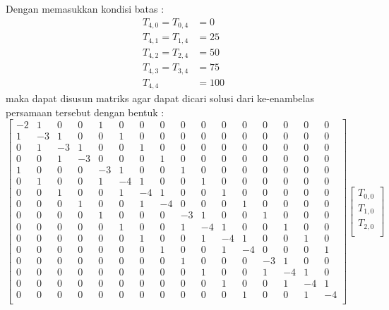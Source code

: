 \documentclass[a4paper,12pt]{article}
\numberwithin{equation}{section} %
\begin{document}
Dengan memasukkan kondisi batas :
\begin{align*}
T_{4,0} = T_{0,4} &= 0\\ 
T_{4,1} = T_{1,4} &= 25\\ 
T_{4,2} = T_{2,4} &= 50\\ 
T_{4,3} = T_{3,4} &= 75\\ 
T_{4,4} &= 100
\end{align*}
maka dapat disusun matriks agar dapat dicari solusi dari ke-enambelas persamaan tersebut dengan bentuk :
\setcounter{MaxMatrixCols}{20}
\begin{equation}
\begin{bmatrix}
-2 & 1 & 0 & 0 & 1 & 0 & 0 & 0 & 0 & 0 & 0 & 0 & 0 & 0 & 0 & 0\\ 
1 & -3 & 1 & 0 & 0 & 1 & 0 & 0 & 0 & 0 & 0 & 0 & 0 & 0 & 0 & 0\\ 
0 & 1 & -3 & 1 & 0 & 0 & 1 & 0 & 0 & 0 & 0 & 0 & 0 & 0 & 0 & 0\\ 
0 & 0 & 1 & -3 & 0 & 0 & 0 & 1 & 0 & 0 & 0 & 0 & 0 & 0 & 0 & 0\\ 
1 & 0 & 0 & 0 & -3 & 1 & 0 & 0 & 1 & 0 & 0 & 0 & 0 & 0 & 0 & 0\\ 
0 & 1 & 0 & 0 & 1 & -4 & 1 & 0 & 0 & 1 & 0 & 0 & 0 & 0 & 0 & 0\\ 
0 & 0 & 1 & 0 & 0 & 1 & -4 & 1 & 0 & 0 & 1 & 0 & 0 & 0 & 0 & 0\\
0 & 0 & 0 & 1 & 0 & 0 & 1 & -4 & 0 & 0 & 0 & 1 & 0 & 0 & 0 & 0\\
0 & 0 & 0 & 0 & 1 & 0 & 0 & 0 & -3 & 1 & 0 & 0 & 1 & 0 & 0 & 0\\
0 & 0 & 0 & 0 & 0 & 1 & 0 & 0 & 1 & -4 & 1 & 0 & 0 & 1 & 0 & 0\\
0 & 0 & 0 & 0 & 0 & 0 & 1 & 0 & 0 & 1 & -4 & 1 & 0 & 0 & 1 & 0\\
0 & 0 & 0 & 0 & 0 & 0 & 0 & 1 & 0 & 0 & 1 & -4 & 0 & 0 & 0 & 1\\
0 & 0 & 0 & 0 & 0 & 0 & 0 & 0 & 1 & 0 & 0 & 0 & -3 & 1 & 0 & 0\\
0 & 0 & 0 & 0 & 0 & 0 & 0 & 0 & 0 & 1 & 0 & 0 & 1 & -4 & 1 & 0\\
0 & 0 & 0 & 0 & 0 & 0 & 0 & 0 & 0 & 0 & 1 & 0 & 0 & 1 & -4 & 1\\
0 & 0 & 0 & 0 & 0 & 0 & 0 & 0 & 0 & 0 & 0 & 1 & 0 & 0 & 1 & -4\\
\end{bmatrix}
\begin{bmatrix}
T_{0,0}\\ 
T_{1,0}\\ 
T_{2,0}\\ 

\end{bmatrix}
\end{equation}
\end{document}
